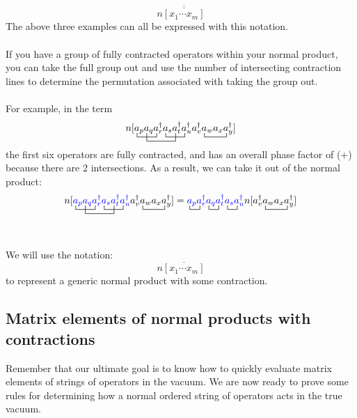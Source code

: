 \documentclass{article}
\newcommand{\ol}{\overline}
\newcommand{\ctr}{\bcontraction}
\newcommand{\dg}{\ensuremath{^\dagger} }
\newcommand{\cd}{\ensuremath{\cdots} }
\begin{document}
\[n\ol{\ol{[x_1 \cd x_m]}} \]
The above three examples can all be expressed with this notation. \\ \\
If you have a group of fully contracted operators within your normal product, you can take the full group out and use the number of intersecting contraction lines
to determine the permutation associated with taking the group out.  \\ \\
For example, in the term 
\[\ctr{n[}{a}{{}_p a_q}{a}
\ctr[2ex]{n[a_p }{a}{{}_q a_r\dg a_s }{a}
\ctr{n[a_p a_q a_r\dg }{a}{{}_s a_t\dg }{a}
\ctr{n[a_p a_q a_r\dg a_s a_t\dg a_u\dg a_v\dg}{a}{{}_w a_x}{a}
n[a_p a_q a_r\dg a_s a_t\dg a_u\dg a_v\dg a_w a_x a_y\dg] \]
the first six operators are fully contracted, and has an overall phase factor of (+) because there are 2 intersections.
As a result, we can take it out of the normal product: 
\[\ctr{n[}{a}{{}_p a_q}{a}
\ctr[2ex]{n[a_p }{a}{{}_q a_r\dg a_s }{a}
\ctr{n[a_p a_q a_r\dg }{a}{{}_s a_t\dg }{a}
\ctr{n[a_p a_q a_r\dg a_s a_t\dg a_u\dg a_v\dg}{a}{{}_w a_x}{a}
n[{\color{blue} a_p a_q a_r\dg a_s a_t\dg a_u\dg} a_v\dg a_w a_x a_y\dg] =  
\ctr{}{a}{{}_p}{a}
\ctr{a_p a_r\dg }{a}{{}_q }{a}
\ctr{a_p a_r\dg a_q a_t\dg  }{a}{{}_s}{a}
\ctr{a_p a_r\dg a_q a_t\dg a_s  a_u\dg n[a_v\dg}{a}{{}_w a_x}{a}
{\color{blue} a_p a_r\dg a_q a_t\dg a_s  a_u\dg }n[a_v\dg a_w a_x a_y\dg]\]
\\ \\
We will use the notation:
\[n\ol{[x_1 \cd x_m]} \] 
to represent a generic normal product with some contraction.
\subsection{Matrix elements of normal products with contractions}
Remember that our ultimate goal is to know how to quickly evaluate matrix elements of strings of operators in the vacuum. 
We are now ready to prove some rules for determining how a normal ordered string of operators acts in the true vacuum.
\end{document}
